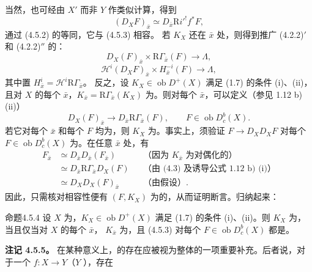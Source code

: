 当然，也可经由
$X'$ 而非 $Y$ 作类似计算，得到
\[(D_XF)_{\bar x}\simeq D_{\bar x}\mathrm Ri'^!f^*F,\]
通过 (4.5.2) 的等同，它与 (4.5.3) 相容。
若 $K_X$ 还在 $\bar x$ 处，则得到推广 (4.2.2)$'$ 和 (4.2.2)$''$ 的：
\[
D_X(F)_{\bar x}\times\mathrm R\Gamma_{\bar x}(F)\longrightarrow\Lambda,\tag{4.5.3$'$}
\]
\[
\mathscr H^i(D_XF)_{\bar x}\times H_{\bar x}^{-i}(F)\longrightarrow\Lambda,\tag{4.5.3$''$}
\]
其中置 $H_{\bar x}^i=\mathscr H^i\mathrm R\Gamma_{\bar x}$。
反之，设 $K_X\in\operatorname{ob}D^+(X)$ 满足 (1.7) 的条件 (i)、(ii)，且对 $X$ 的每个 $\bar x$，$K_{\bar x}=\mathrm R\Gamma_{\bar x}(K_X)$ 为。则对每个 $\bar x$，可以定义（参见 1.12 b) (ii)）
\[
D_X(F)_{\bar x}\longrightarrow D_{\bar x}\mathrm R\Gamma_{\bar x}(F),\qquad F\in\operatorname{ob}D_c^b(X).\tag{4.5.3}
\]
若它对每个 $\bar x$ 和每个 $F$ 均为，则 $K_X$ 为。事实上，须验证 $F\to D_XD_XF$ 对每个 $F\in\operatorname{ob}D_c^b(X)$ 为。在任意 $\bar x$ 处，有
\[
\begin{aligned}
F_{\bar x}&\simeq D_{\bar x}D_{\bar x}(F_{\bar x})&&\text{（因为 $K_{\bar x}$ 为对偶化的）}\\
&\simeq D_{\bar x}\mathrm R\Gamma_{\bar x}D_X(F)&&\text{（由 (4.3) 及诱导公式 1.12 b) (i)）}\\
&\simeq D_XD_X(F)_{\bar x}&&\text{（由假设）}.
\end{aligned}
\]
因此，只需核对相容性便有 $(F,K_X)$ 为的，从而证明断言。归纳起来：
\begin{SGAresult}{命题}{4.5.4}
设 $X$ 为，$K_X\in\operatorname{ob}D^+(X)$ 满足 (1.7) 的条件 (i)、(ii)。则 $K_X$ 为，当且仅当对 $X$ 的每个 $\bar x$， $K_{\bar x}$ 为，且 (4.5.3) 对每个 $F\in\operatorname{ob}D_c^b(X)$ 都是。
\end{SGAresult}
\textbf{注记 4.5.5。} 在某种意义上，的存在应被视为整体的一项重要补充。后者说，对于一个 $f:X\to Y$（$Y$ ），存在
